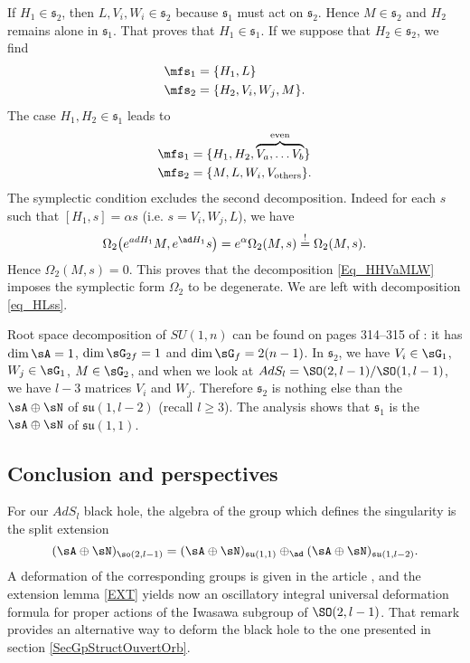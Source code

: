 If $H_1\in\mathfrak{s}_2$, then $L,V_i,W_i\in\mathfrak{s}_2$ because $\mathfrak{s}_1$ must act on $\mathfrak{s}_2$. Hence $M\in\mathfrak{s}_2$ and $H_2$ remains alone in $\mathfrak{s}_1$. That proves that $H_1\in\mathfrak{s}_1$. If we suppose that $H_2\in\mathfrak{s}_2$, we find
\begin{equation}  \label{eq_HLss}
 \begin{split}
  \mfs_1&=\{ H_1,L  \}\\
\mfs_2&=\{ H_2,V_i,W_j,M  \}.
\end{split}   
\end{equation}
The case $H_1,H_2\in\mathfrak{s}_1$ leads to
\begin{equation}   \label{Eq_HHVaMLW}
 \begin{split}
	\mfs_1&=\{ H_1,H_2,\overbrace{V_a,\ldots V_b}^{\text{even}}  \}\\
	\mfs_2&=\{ M,L,W_i,V_{\text{others}}  \}.
\end{split}   
\end{equation}
The symplectic condition excludes the second decomposition. Indeed for each $s$ such that $[H_1,s]=\alpha s$ (i.e. $s=V_i,W_j,L$), we have
\[ 
  \Omega_2\big(  e^{ad H_1}M, e^{\ad H_1}s \big)= e^{\alpha}\Omega_2(M,s)\stackrel{!}{=}\Omega_2(M,s).
\]
Hence $\Omega_2(M,s)=0$. This proves that the decomposition \eqref{Eq_HHVaMLW} imposes the symplectic form $\Omega_2$ to be degenerate. We are left with decomposition \eqref{eq_HLss}.

Root space decomposition of $SU(1,n)$ can be found on pages 314--315 of \cite{Knapp}: it has $\dim\sA=1$, $\dim\sG_{2f}=1$ and $\dim\sG_f=2(n-1)$. In $\mathfrak{s}_2$, we have $V_i\in\sG_1$, $W_j\in\sG_1$, $M\in\sG_2$, and when we look at $AdS_l=\SO(2,l-1)/\SO(1,l-1)$, we have $l-3$ matrices $V_i$ and $W_j$. Therefore $\mathfrak{s}_2$ is nothing else than the $\sA\oplus\sN$ of $\mathfrak{su}(1,l-2)$ (recall $l\geq3$). The analysis shows that $\mathfrak{s}_1$ is the $\sA\oplus\sN$ of $\mathfrak{su}(1,1)$.

\subsection{Conclusion and perspectives}

For our $AdS_l$ black hole, the algebra of the group which defines the singularity is the split extension 
\[ 
  (\sA\oplus\sN)_{\so(2,l-1)}=(\sA\oplus\sN)_{\mathfrak{su}(1,1)}\oplus_{\ad}(\sA\oplus\sN)_{\mathfrak{su}(1,l-2)}.
\]
A deformation of the corresponding groups is given in the article \cite{Biel-Massar}, and the extension lemma \ref{EXT} yields now an oscillatory integral universal deformation formula for proper actions of the Iwasawa subgroup of $\SO(2,l-1)$. That remark provides an alternative way to deform the black hole to the one presented in section \ref{SecGpStructOuvertOrb}.

